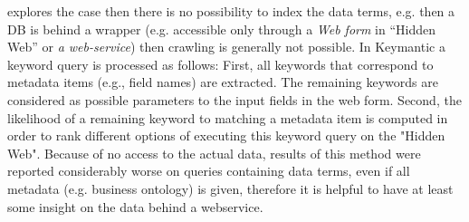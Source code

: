 
\cite{Keymantic10, semantics_without_access} explores the case then there is no possibility to index the data terms, e.g. then a DB is behind a wrapper (e.g. accessible only through a \textit{Web form} in “Hidden Web” or \textit{a web-service}) then crawling is generally not possible.
%
In Keymantic\cite{Keymantic10} a keyword query is processed as follows: First, all keywords that  correspond to metadata items (e.g., field names) are extracted. The remaining keywords are considered as possible parameters to the input fields in the web form. Second, the likelihood of a remaining keyword to matching a metadata item is computed in order to rank different options of executing this keyword query on the "Hidden Web"\cite[p.942]{ethz2012}. Because of no access to the actual data, results of this method were reported considerably worse on queries containing data terms, even if all metadata (e.g. business ontology) is given\cite{ethz2012}, therefore it is helpful to have at least some insight on the data behind a webservice.
